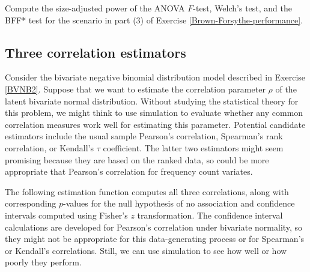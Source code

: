 \documentclass[
]{book}
\begin{document}
Compute the size-adjusted power of the ANOVA \(F\)-test, Welch's test, and the BFF* test for the scenario in part (3) of Exercise \ref{Brown-Forsythe-performance}.

\subsection{Three correlation estimators}\label{three-correlation-estimators}

Consider the bivariate negative binomial distribution model described in Exercise \ref{BVNB2}.
Suppose that we want to estimate the correlation parameter \(\rho\) of the latent bivariate normal distribution.
Without studying the statistical theory for this problem, we might think to use simulation to evaluate whether any common correlation measures work well for estimating this parameter.
Potential candidate estimators include the usual sample Pearson's correlation, Spearman's rank correlation, or Kendall's \(\tau\) coefficient.
The latter two estimators might seem promising because they are based on the ranked data, so could be more appropriate that Pearson's correlation for frequency count variates.

The following estimation function computes all three correlations, along with corresponding \(p\)-values for the null hypothesis of no association and confidence intervals computed using Fisher's \(z\) transformation. The confidence interval calculations are developed for Pearson's correlation under bivariate normality, so they might not be appropriate for this data-generating process or for Spearman's or Kendall's correlations.
Still, we can use simulation to see how well or how poorly they perform.
\end{document}
